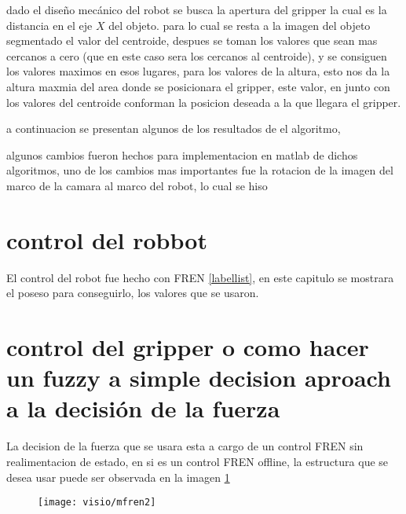     dado el diseño mecánico del robot se busca la apertura del gripper la cual es la distancia en el eje $X$ del objeto.
    para lo cual se resta a la imagen del objeto segmentado el valor del centroide, despues se toman los valores que sean mas cercanos a cero (que en este caso sera los cercanos al centroide), y  se consiguen los valores maximos en esos lugares, para los valores de la altura,  esto nos da la altura maxmia del area donde se posicionara el gripper, este valor, en junto con los valores del centroide conforman la posicion deseada a la que llegara el gripper.
    
    a continuacion se presentan algunos de los resultados de el algoritmo, 
    
    
    
    algunos cambios fueron hechos para implementacion en matlab de dichos algoritmos, uno de los cambios mas importantes fue la rotacion de la imagen del marco de la camara al marco del robot, lo cual se hiso 
    
    
    
    
    \section{control del robbot}
    El control del robot fue hecho con FREN \cref{labellist}, en este capitulo se mostrara el poseso para conseguirlo, los valores que se usaron.
    
    
    \section{control del gripper o como hacer un fuzzy  a simple decision aproach a la decisión de la fuerza }
    
    La decision de la fuerza que se usara esta a cargo de un control FREN sin realimentacion de estado, en si es un control FREN offline, la estructura que se desea usar puede ser observada en la imagen \cref{fig:mfren2}
    
    \begin{figure}[h]
    	\centering
    	\texttt{[image: visio/mfren2]}
    	\caption{}
    	\label{fig:mfren2}
    \end{figure}
    

